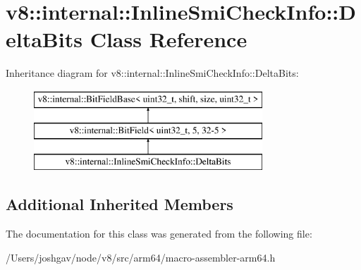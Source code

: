 \hypertarget{classv8_1_1internal_1_1_inline_smi_check_info_1_1_delta_bits}{}\section{v8\+:\+:internal\+:\+:Inline\+Smi\+Check\+Info\+:\+:Delta\+Bits Class Reference}
\label{classv8_1_1internal_1_1_inline_smi_check_info_1_1_delta_bits}
Inheritance diagram for v8\+:\+:internal\+:\+:Inline\+Smi\+Check\+Info\+:\+:Delta\+Bits\+:\begin{figure}[H]
\begin{center}
\leavevmode
\includegraphics[height=3.000000cm]{classv8_1_1internal_1_1_inline_smi_check_info_1_1_delta_bits}
\end{center}
\end{figure}
\subsection*{Additional Inherited Members}


The documentation for this class was generated from the following file\+:\begin{DoxyCompactItemize}
\item 
/\+Users/joshgav/node/v8/src/arm64/macro-\/assembler-\/arm64.\+h\end{DoxyCompactItemize}
